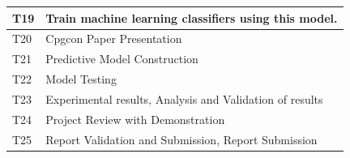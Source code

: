 \documentclass[oneside,a4paper,12pt]{pictreport}
\begin{document}
\begin{table}[]
\begin{tabular}{|l|l|}
T19                  & Train machine learning classifiers using this model.
 \\ \hline
T20                  & Cpgcon Paper Presentation
 \\ \hline
T21                  & Predictive Model Construction \\ \hline
T22                  & Model Testing \\ \hline
T23                  & Experimental results, Analysis and Validation of results \\ \hline
T24                  &Project Review with Demonstration
 \\ \hline
T25                  &Report Validation and Submission, Report Submission
 \\ \hline
\end{tabular}
\end{table}
\end{document}
